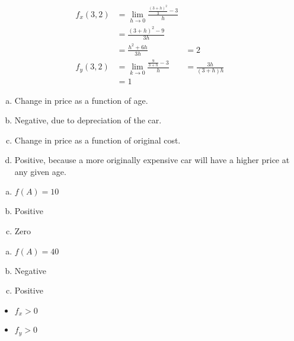 \documentclass[10pt]{extarticle}
\begin{document}
  \begin{problem}{14.1}
    \begin{description}[font=\normalfont]
      \item[2:]
        \begin{align*}
          f_x(3,2) &= \lim_{h \rightarrow 0}\frac{\frac{(3+h)^2}{3} - 3}{h}\\
                   &= \frac{(3+h)^2 - 9}{3h}\\
                   &= \frac{h^2 + 6h}{3h}
                   &= 2\\
          f_y(3,2) &= \lim_{k\rightarrow 0}\frac{\frac{9}{3 + h} - 3}{h}
                   &= \frac{3h}{(3+h)h}\\
                   &= 1
        \end{align*}
      \item[4:]
        \begin{enumerate}[(a)]
          \item Change in price as a function of age.
          \item Negative, due to depreciation of the car.
          \item Change in price as a function of original cost.
          \item Positive, because a more originally expensive car will have a higher price at any given age.
        \end{enumerate}
      \item[10:]
        \begin{enumerate}[(a)]
          \item $f(A) = 10$
          \item Positive
          \item Zero
        \end{enumerate}
      \item[14:]
        \begin{enumerate}[(a)]
          \item $f(A) = 40$
          \item Negative
          \item Positive
        \end{enumerate}
      \item[16:]
        \begin{itemize}
          \item $f_x > 0$
          \item $f_y > 0$
        \end{itemize}
      \item[20:]

\end{description}
\end{problem}
\end{document}
